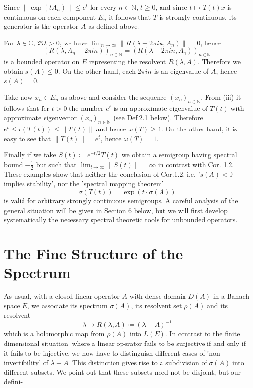 \newpage

Since $\|\exp(tA_{n})\| \leq e^{t}$ for every $n \in \mathbb{N}$, $t \geq 0$, and since $t \mapsto T(t)x$ is continuous on each component $E_{n}$ it follows that $T$ is strongly continuous.
Its generator is the operator $A$ as defined above.

For $\lambda \in \mathbb{C}$, $\Re\lambda > 0$, we have $\lim_{n \to \infty} \|R(\lambda-2\pi in,A_{n})\| = 0$, hence
\[
    (R(\lambda,A_{n}+2\pi in))_{n \in \mathbb{N}} = (R(\lambda-2\pi in,A_{n}))_{n \in \mathbb{N}}
\]
is a bounded operator on $E$ representing the resolvent $R(\lambda,A)$.
Therefore we obtain $s(A) \leq 0$.
On the other hand, each $2\pi in$ is an eigenvalue of $A$, hence $s(A) = 0$.

Take now $x_{n} \in E_{n}$ as above and consider the sequence $(x_{n})_{n \in \mathbb{N}}$.
From (iii) it follows that for $t > 0$ the number $e^{t}$ is an approximate eigenvalue of $T(t)$ with approximate eigenvector $(x_{n})_{n \in \mathbb{N}}$ (see Def.2.1 below).
Therefore $e^{t} \leq r(T(t)) \leq \|T(t)\|$ and hence $\omega(T) \geq 1$.
On the other hand, it is easy to see that $\|T(t)\| = e^{t}$, hence $\omega(T) = 1$.


Finally if we take $S(t) \coloneqq e^{-t/2}T(t)$ we obtain a semigroup having spectral bound $-\frac{1}{2}$ but such that $\lim_{t \to \infty} \|S(t)\| = \infty$ in contrast with Cor. 1.2.
\\

These examples show that neither the conclusion of Cor.1.2, i.e. '$s(A) < 0$ implies stability', nor the 'spectral mapping theorem'
\[
    \sigma(T(t)) = \exp(t\cdot\sigma(A))
\]
is valid for arbitrary strongly continuous semigroups.
A careful analysis of the general situation will be given in Section 6 below, but we will first develop systematically the necessary spectral theoretic tools for unbounded operators.
\section{The Fine Structure of the Spectrum}\label{sec:a3-2}

As usual, with a closed linear operator $A$ with dense domain $D(A)$ in a Banach space $E$, we associate its spectrum $\sigma(A)$, its resolvent set $\rho(A)$ and its resolvent
\[
    \lambda \mapsto R(\lambda,A) \coloneqq (\lambda - A)^{-1}
\]
which is a holomorphic map from $\rho(A)$ into $L(E)$.
In contrast to the finite dimensional situation, where a linear operator fails to be surjective if and only if it fails to be injective, we now have to distinguish different cases of 'non-invertibility' of $\lambda - A$.
This distinction gives rise to a subdivision of $\sigma(A)$ into different subsets.
We point out that these subsets need not be disjoint, but our defini-


